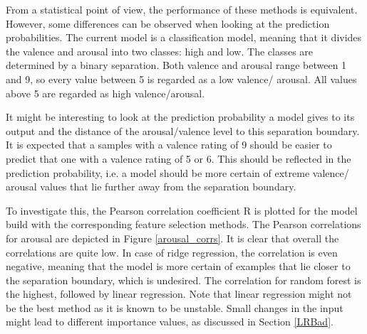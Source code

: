 

From a statistical point of view, the performance of these methods is equivalent. However, some differences can be observed when looking at the prediction probabilities. The current model is a classification model, meaning that it divides the valence and arousal into two classes: high and low. The classes are determined by a binary separation. Both valence and arousal range between 1 and 9, so every value between 5 is regarded as a low valence/ arousal. All values above 5 are regarded as high valence/arousal.

\npar

It might be interesting to look at the prediction probability a model gives to its output and the distance of the arousal/valence level to this separation boundary. It is expected that a samples with a valence rating of 9 should be easier to predict that one with a valence rating of 5 or 6. This should be reflected in the prediction probability, i.e. a model should be more certain of extreme valence/ arousal values that lie further away from the separation boundary.

\npar

To investigate this, the Pearson correlation coefficient R is plotted for the model build with the corresponding feature selection methods. The Pearson correlations for arousal are depicted in Figure \ref{arousal_corrs}. It is clear that overall the correlations are quite low. In case of ridge regression, the correlation is even negative, meaning that the model is more certain of examples that lie closer to the separation boundary, which is undesired. The correlation for random forest is the highest, followed by linear regression. Note that linear regression might not be the best method as it is known to be unstable. Small changes in the input might lead to different importance values, as discussed in Section \ref{LRBad}.


